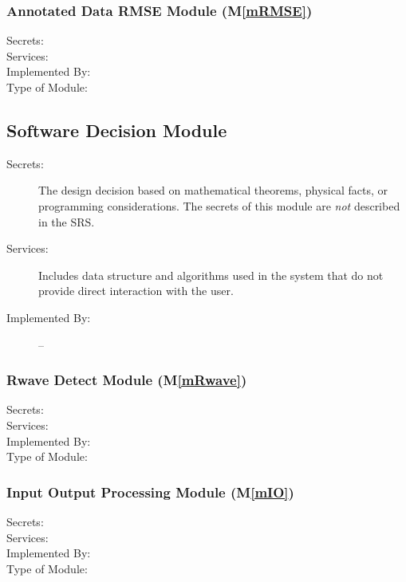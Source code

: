 \documentclass[12pt, titlepage]{article}
\newcommand{\mref}[1]{M\ref{#1}}
\begin{document}
\subsubsection{Annotated Data RMSE Module (\mref{mRMSE})}

\begin{description}
\item[Secrets:]
\item[Services:]
\item[Implemented By:] \progname
\item[Type of Module:]
\end{description}


\subsection{Software Decision Module}

\begin{description}
\item[Secrets:] The design decision based on mathematical theorems, physical
  facts, or programming considerations. The secrets of this module are
  \emph{not} described in the SRS.
\item[Services:] Includes data structure and algorithms used in the system that
  do not provide direct interaction with the user. 
\item[Implemented By:] --
\end{description}

\subsubsection{Rwave Detect Module (\mref{mRwave})}

\begin{description}
\item[Secrets:]
\item[Services:]
\item[Implemented By:] \progname
\item[Type of Module:]
\end{description}

\subsubsection{Input Output Processing Module (\mref{mIO})}

\begin{description}
\item[Secrets:]
\item[Services:]
\item[Implemented By:] \progname
\item[Type of Module:]
\end{description}
\end{document}
